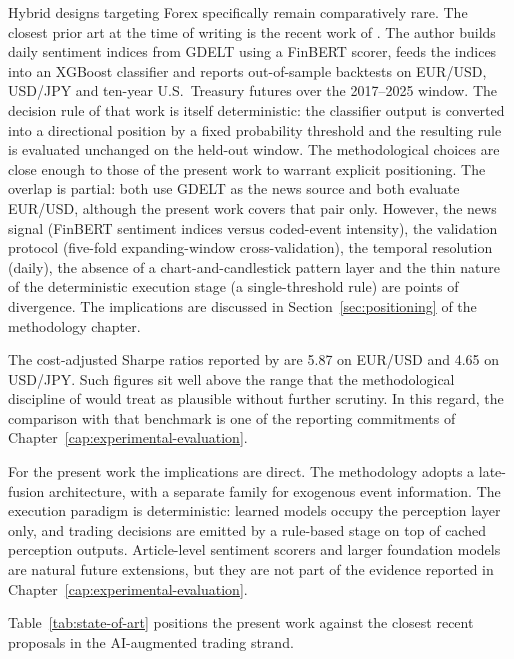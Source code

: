 Hybrid designs targeting Forex specifically remain comparatively rare. The closest prior art at the time of writing is the recent work of . The author builds daily sentiment indices from GDELT using a FinBERT scorer, feeds the indices into an XGBoost classifier and reports out-of-sample backtests on EUR/USD, USD/JPY and ten-year U.S.~Treasury futures over the 2017--2025 window. The decision rule of that work is itself deterministic: the classifier output is converted into a directional position by a fixed probability threshold and the resulting rule is evaluated unchanged on the held-out window. The methodological choices are close enough to those of the present work to warrant explicit positioning. The overlap is partial: both use GDELT as the news source and both evaluate EUR/USD, although the present work covers that pair only. However, the news signal (FinBERT sentiment indices versus coded-event intensity), the validation protocol (five-fold expanding-window cross-validation), the temporal resolution (daily), the absence of a chart-and-candlestick pattern layer and the thin nature of the deterministic execution stage (a single-threshold rule) are points of divergence. The implications are discussed in Section~\ref{sec:positioning} of the methodology chapter.

The cost-adjusted Sharpe ratios reported by  are 5.87 on EUR/USD and 4.65 on USD/JPY. Such figures sit well above the range that the methodological discipline of  would treat as plausible without further scrutiny. In this regard, the comparison with that benchmark is one of the reporting commitments of Chapter~\ref{cap:experimental-evaluation}.

For the present work the implications are direct. The methodology adopts a late-fusion architecture, with a separate family for exogenous event information. The execution paradigm is deterministic: learned models occupy the perception layer only, and trading decisions are emitted by a rule-based stage on top of cached perception outputs. Article-level sentiment scorers and larger foundation models are natural future extensions, but they are not part of the evidence reported in Chapter~\ref{cap:experimental-evaluation}.

Table~\ref{tab:state-of-art} positions the present work against the closest recent proposals in the AI-augmented trading strand.

